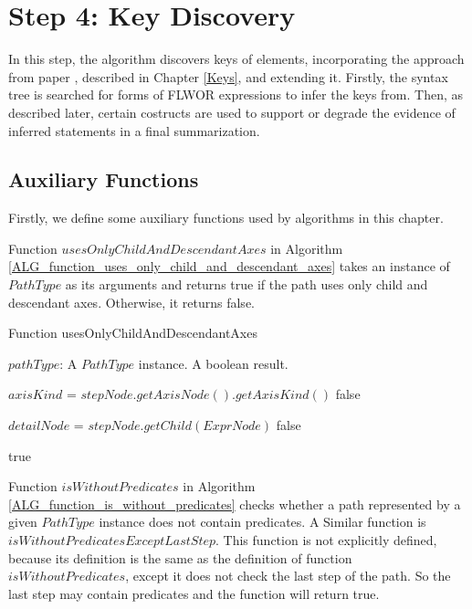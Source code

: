 
\section{Step 4: Key Discovery}
In this step, the algorithm discovers keys of elements, incorporating the approach from paper \cite{Necasky:2009:DXK:1529282.1529414}, described in Chapter \ref{Keys}, and extending it. Firstly, the syntax tree is searched for forms of FLWOR expressions to infer the keys from. Then, as described later, certain costructs are used to support or degrade the evidence of inferred statements in a final summarization.

\subsection{Auxiliary Functions}
Firstly, we define some auxiliary functions used by algorithms in this chapter.

Function $usesOnlyChildAndDescendantAxes$ in Algorithm \ref{ALG_function_uses_only_child_and_descendant_axes} takes an instance of $PathType$ as its arguments and returns true if the path uses only child and descendant axes. Otherwise, it returns false.

\begin{algorithm}
\caption{Function usesOnlyChildAndDescendantAxes}
\label{ALG_function_uses_only_child_and_descendant_axes}
\begin{algorithmic}[1]
\REQUIRE $pathType$: A $PathType$ instance.
\ENSURE A boolean result.

		\STATE $axisKind$ = $stepNode.getAxisNode().getAxisKind()$
			\RETURN false
		\ENDIF
	\ENDIF
\ENDFOR

\STATE $detailNode$ = $stepNode.getChild(ExprNode)$
			\RETURN false
		\ENDIF
	\ENDIF
\ENDIF

\RETURN true
\end{algorithmic}
\end{algorithm}

Function $isWithoutPredicates$ in Algorithm \ref{ALG_function_is_without_predicates} checks whether a path represented by a given $PathType$ instance does not contain predicates. A Similar function is  $isWithoutPredicatesExceptLastStep$. This function is not explicitly defined, because its definition is the same as the definition of function $isWithoutPredicates$, except it does not check the last step of the path. So the last step may contain predicates and the function will return true.

